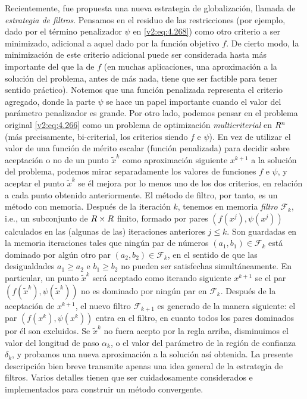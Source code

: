 Recientemente, fue propuesta una nueva estrategia de globalización, llamada de \textit{estrategia de filtros}. Pensamos en el residuo de las restricciones (por ejemplo, dado por el término penalizador $\psi$ en \eqref{v2:eq:4.268}) como otro criterio a ser minimizado, adicional a aquel dado por la función objetivo $f$. De cierto modo, la minimización de este criterio adicional puede ser considerada hasta más importante del que la de $f$ (en muchas aplicaciones, una aproximación a la solución del problema, antes de más nada, tiene que ser factible para tener sentido práctico). Notemos que una función penalizada representa el criterio agregado, donde la parte $\psi$ se hace un papel importante cuando el valor del parámetro penalizador es grande.
Por otro lado, podemos pensar en el problema original \eqref{v2:eq:4.266} como un problema de optimización \textit{multicriterial} en $R^n$ (más precisamente, bi-criterial, los criterios siendo $f$ e $\psi$). En vez de utilizar el valor de una función de mérito escalar (función penalizada) para decidir sobre aceptación o no de un punto $\tilde{x}^k$ como aproximación siguiente $x^{k+1}$ a la solución del problema, podemos mirar separadamente los valores de funciones $f$ e $\psi$, y aceptar el punto $\tilde{x}^k$ se él mejora por lo menos uno de los dos criterios, en relación a cada punto obtenido anteriormente. El método de filtro, por tanto, es un método con memoria. Después de la iteración $k$, tenemos en memoria \textit{filtro} $\mathcal{F}_k$, i.e., un subconjunto de $R \times R$ finito, formado por pares $(f(x^j), \psi(x^j))$ calculados en las (algunas de las) iteraciones anteriores $j \le k$. Son guardadas en la memoria iteraciones tales que ningún par de números $(a_1, b_1) \in \mathcal{F}_k$ está dominado por algún otro par $(a_2, b_2) \in \mathcal{F}_k$, en el sentido de que las desigualdades $a_1 \ge a_2$ e $b_1 \ge b_2$ no pueden ser satisfechas simultáneamente. En particular, un punto $\tilde{x}^k$ será aceptado como iterando siguiente $x^{k+1}$ se el par $(f(\tilde{x}^k), \psi(\tilde{x}^k))$ no es dominado por ningún par en $\mathcal{F}_k$. Después de la aceptación de $x^{k+1}$, el nuevo filtro $\mathcal{F}_{k+1}$ es generado de la manera siguiente: el par $(f(x^k), \psi(x^k))$ entra en el filtro, en cuanto todos los pares dominados por él son excluidos. Se $\tilde{x}^k$ no fuera acepto por la regla arriba, disminuimos el valor del longitud de paso $\alpha_k$, o el valor del parámetro de la región de confianza $\delta_k$, y probamos una nueva aproximación a la solución así obtenida. La presente descripción bien breve transmite apenas una idea general de la estrategia de filtros. Varios detalles tienen que ser cuidadosamente considerados e implementados para construir un método convergente.

